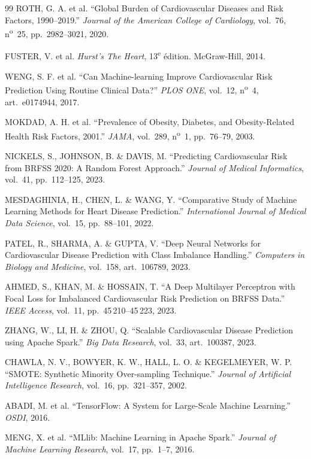 \documentclass[12pt,a4paper]{report}
\begin{document}
\begin{thebibliography}{99}
ROTH, G. A. et al.
``Global Burden of Cardiovascular Diseases and Risk Factors, 1990--2019.''
\textit{Journal of the American College of Cardiology}, vol.~76, n\textsuperscript{o}~25,
pp.~2982--3021, 2020.

FUSTER, V. et al.
\textit{Hurst's The Heart}, 13\textsuperscript{e} édition.
McGraw-Hill, 2014.

WENG, S. F. et al.
``Can Machine-learning Improve Cardiovascular Risk Prediction Using Routine
Clinical Data?''
\textit{PLOS ONE}, vol.~12, n\textsuperscript{o}~4, art.~e0174944, 2017.

MOKDAD, A. H. et al.
``Prevalence of Obesity, Diabetes, and Obesity-Related Health Risk Factors, 2001.''
\textit{JAMA}, vol.~289, n\textsuperscript{o}~1, pp.~76--79, 2003.

NICKELS, S., JOHNSON, B. \& DAVIS, M.
``Predicting Cardiovascular Risk from BRFSS 2020: A Random Forest Approach.''
\textit{Journal of Medical Informatics}, vol.~41, pp.~112--125, 2023.

MESDAGHINIA, H., CHEN, L. \& WANG, Y.
``Comparative Study of Machine Learning Methods for Heart Disease Prediction.''
\textit{International Journal of Medical Data Science}, vol.~15, pp.~88--101, 2022.

PATEL, R., SHARMA, A. \& GUPTA, V.
``Deep Neural Networks for Cardiovascular Disease Prediction with Class
Imbalance Handling.''
\textit{Computers in Biology and Medicine}, vol.~158, art.~106789, 2023.

AHMED, S., KHAN, M. \& HOSSAIN, T.
``A Deep Multilayer Perceptron with Focal Loss for Imbalanced Cardiovascular
Risk Prediction on BRFSS Data.''
\textit{IEEE Access}, vol.~11, pp.~45\,210--45\,223, 2023.

ZHANG, W., LI, H. \& ZHOU, Q.
``Scalable Cardiovascular Disease Prediction using Apache Spark.''
\textit{Big Data Research}, vol.~33, art.~100387, 2023.

CHAWLA, N. V., BOWYER, K. W., HALL, L. O. \& KEGELMEYER, W. P.
``SMOTE: Synthetic Minority Over-sampling Technique.''
\textit{Journal of Artificial Intelligence Research}, vol.~16, pp.~321--357, 2002.

ABADI, M. et al.
``TensorFlow: A System for Large-Scale Machine Learning.''
\textit{OSDI}, 2016.

MENG, X. et al.
``MLlib: Machine Learning in Apache Spark.''
\textit{Journal of Machine Learning Research}, vol.~17, pp.~1--7, 2016.


\end{thebibliography}
\end{document}

